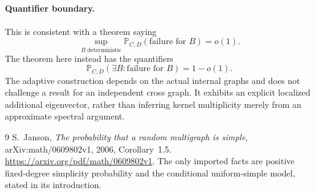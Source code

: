 \documentclass[11pt]{article}
\newcommand{\Prob}{\mathbb P}
\begin{document}
\paragraph{Quantifier boundary.}
This is consistent with a theorem saying
\[
 \sup_{B\text{ deterministic}}\Prob_{C,D}(\text{failure for }B)=o(1).
\]
The theorem here instead has the quantifiers
\[
 \Prob_{C,D}(\exists B:\text{failure for }B)=1-o(1).
\]
The adaptive construction depends on the actual internal graphs and
does not challenge a result for an independent cross graph. It exhibits
an explicit localized additional eigenvector, rather than inferring
kernel multiplicity merely from an approximate spectral argument.

\begin{thebibliography}{9}
S.~Janson, \emph{The probability that a random multigraph is simple},
arXiv:math/0609802v1, 2006, Corollary~1.5.
\url{https://arxiv.org/pdf/math/0609802v1}.
The only imported facts are positive fixed-degree simplicity probability
and the conditional uniform-simple model, stated in its introduction.
\end{thebibliography}
\end{document}
